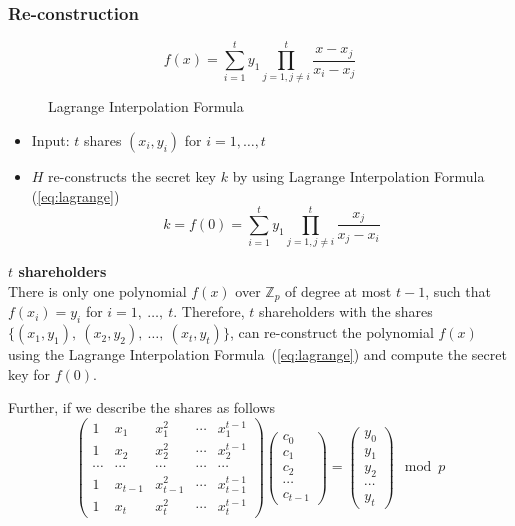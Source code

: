 \subsubsection*{Re-construction}
\begin{figure}[H]
  \begin{equation}\label{eq:lagrange}
    f(x) = \sum\limits_{i=1}^t y_1 \prod\limits_{j=1, j\not=i}^t \frac{x-x_j}{x_i-x_j}
  \end{equation}
  \label{asdf}
  \caption{Lagrange Interpolation Formula}
\end{figure}

\begin{itemize}
\item Input: $t$ shares $(x_i, y_i)$ for $i = 1, \ldots, t$
\item $H$ re-constructs the secret key $k$ by using Lagrange Interpolation Formula (\ref{eq:lagrange})
  \[ k = f(0) = \sum\limits_{i=1}^t y_1 \prod\limits_{j=1, j\not=i}^t \frac{x_j}{x_j-x_i} \]
\end{itemize}

\textbf{$t$ shareholders} \\
There is only one polynomial $f(x)$ over $\mathbb{Z}_p$ of degree at
most $t-1$, such that $f(x_i) = y_i$ for $i = 1,\ \dots,\
t$. Therefore, $t$ shareholders with the shares $\{(x_1,y_1),\
(x_2,y_2),\ \ldots,\ (x_t,y_t)\}$, can re-construct the polynomial
$f(x)$ using the Lagrange Interpolation Formula~(\ref{eq:lagrange}) and
compute the secret key for $f(0)$.

Further, if we describe the shares as follows
\begin{equation}
  \begin{pmatrix}
    1      & x_1    & x_1^2    & \cdots & x_1^{t-1} \\
    1      & x_2    & x_2^2    & \cdots & x_2^{t-1} \\
    \cdots & \cdots & \cdots  & \cdots & \cdots \\
    1      & x_{t-1} & x_{t-1}^2 & \cdots & x_{t-1}^{t-1} \\
    1      & x_t    & x_t^2    & \cdots & x_t^{t-1}
  \end{pmatrix}
  \begin{pmatrix}
    c_0 \\
    c_1 \\
    c_2 \\
    \cdots \\
    c_{t-1}
  \end{pmatrix} =
  \begin{pmatrix}
    y_0 \\
    y_1 \\
    y_2 \\
    \cdots \\
    y_t
  \end{pmatrix} \mod p
\end{equation}

